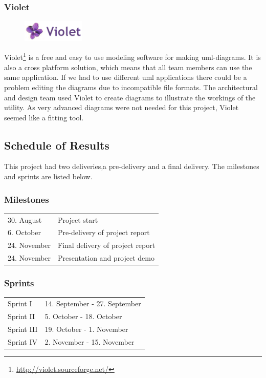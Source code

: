 \subsubsection{Violet}
\begin{figure}
	\vspace{-20pt}
	\includegraphics[width=3cm]{./planning/img/violet_logo}
	\vspace{-20pt}
\end{figure}
Violet\footnote{\url{http://violet.sourceforge.net/}} is a free
and easy to use modeling software for making \Gls{uml}-diagrams.
It is also a cross platform solution, which means that all team members can use
the same application. If we had to use different \Gls{uml} applications there could be a problem
editing the diagrams due to incompatible file formats.
The architectural and design team used Violet to create diagrams
to illustrate the workings of the utility. As very advanced diagrams were not needed for
this project, Violet seemed like a fitting tool.

\subsection{Schedule of Results}
This project had two deliveries,a pre-delivery and a final delivery.
The milestones and sprints are listed below.

\subsubsection{Milestones}
\begin{tabular}{l l}
	30. August & Project start \\
	6. October & Pre-delivery of project report \\
	24. November & Final delivery of project report \\
	24. November & Presentation and project demo \\
\end{tabular}

\subsubsection{Sprints}
\begin{tabular}{l l}
	Sprint I & 14. September - 27. September \\
	Sprint II & 5. October - 18. October \\
	Sprint III & 19. October - 1. November  \\
	Sprint IV & 2. November - 15. November \\
\end{tabular}

